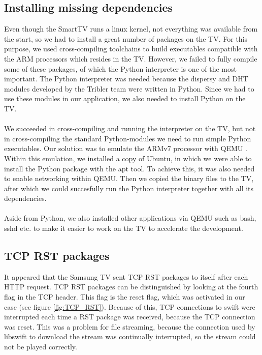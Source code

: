 \subsection{Installing missing dependencies}
Even though the SmartTV runs a linux kernel, not everything was available from the start, so we had to install a great number of packages on the TV.
For this purpose, we used cross-compiling toolchains to build executables compatible with the ARM \cite{arm} processors which resides in the TV. However, we failed
to fully compile some of these packages, of which the Python interpreter is one of the most important. The Python interpreter was needed because the dispersy and DHT modules 
developed by the Tribler team were written in Python. Since we had to use these modules in our application, we also needed to install Python on the TV. 
\\\\
We succeeded in cross-compiling and running the interpreter on the TV, but not in cross-compiling the standard Python-modules we need to run simple Python executables.
Our solution was to emulate the ARMv7 processor with QEMU \cite{qemu}. Within this emulation, we installed a copy of Ubuntu, \cite{ubuntu} in which we were able to install the Python package with the apt tool.
To achieve this, it was also needed to enable networking within QEMU. \cite{qemu-network} Then we copied the binary files to the TV, after which we could succesfully run the Python interpreter together with all its dependencies.
\\\\
Aside from Python, we also installed other applications via QEMU such as bash, sshd etc. to make it easier to work on the TV to accelerate the development.

\subsection{TCP RST packages}
It appeared that the Samsung TV sent TCP RST packages to itself after each HTTP request. TCP RST packages can be distinguished by looking at the fourth flag in the TCP header. This flag is the reset flag, which was activated in our case (see figure \ref{fig:TCP_RST}). Because of this, TCP connections to swift were interrupted each time a RST package was received, because the TCP connection was reset. This was a problem for file streaming, because the connection used by libswift to download the stream was continually interrupted, so the stream could not be played correctly. 

